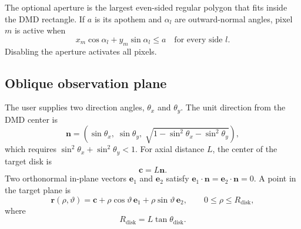 \documentclass[11pt,a4paper]{article}
\newcommand{\vect}[1]{\bm{#1}}
\newcommand{\Rdisk}{R_{\mathrm{disk}}}
\begin{document}
The optional aperture is the largest even-sided regular polygon that fits inside the DMD rectangle. If $a$ is its apothem and $\alpha_l$ are outward-normal angles, pixel $m$ is active when
\begin{equation}
 x_m\cos\alpha_l+y_m\sin\alpha_l\leq a
 \quad\text{for every side }l.
\end{equation}
Disabling the aperture activates all pixels.

\subsection{Oblique observation plane}
The user supplies two direction angles, $\theta_x$ and $\theta_y$. The unit direction from the DMD center is
\begin{equation}
 \vect n=\left(\sin\theta_x,\;\sin\theta_y,\;\sqrt{1-\sin^2\theta_x-\sin^2\theta_y}\right),
 \label{eq:n}
\end{equation}
which requires $\sin^2\theta_x+\sin^2\theta_y<1$. For axial distance $L$, the center of the target disk is
\begin{equation}
 \boxed{\vect c=L\vect n}.\label{eq:center}
\end{equation}
Two orthonormal in-plane vectors $\vect e_1$ and $\vect e_2$ satisfy $\vect e_1\cdot\vect n=\vect e_2\cdot\vect n=0$. A point in the target plane is
\begin{equation}
 \vect r(\rho,\vartheta)=\vect c+\rho\cos\vartheta\,\vect e_1+\rho\sin\vartheta\,\vect e_2,
 \qquad 0\leq\rho\leq\Rdisk,
 \label{eq:plane-point}
\end{equation}
where
\begin{equation}
 \Rdisk=L\tan\theta_{\mathrm{disk}}.
\end{equation}
\end{document}
